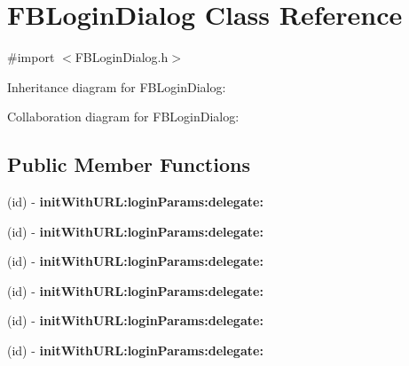 \hypertarget{interface_f_b_login_dialog}{
\section{\-F\-B\-Login\-Dialog \-Class \-Reference}
\label{interface_f_b_login_dialog}
}


{\ttfamily \#import $<$\-F\-B\-Login\-Dialog.\-h$>$}



\-Inheritance diagram for \-F\-B\-Login\-Dialog\-:


\-Collaboration diagram for \-F\-B\-Login\-Dialog\-:
\subsection*{\-Public \-Member \-Functions}
\begin{DoxyCompactItemize}
\item 
\hypertarget{interface_f_b_login_dialog_aa44183cac23b8a20238222be5a338f10}{
(id) -\/ {\bfseries init\-With\-U\-R\-L\-:login\-Params\-:delegate\-:}}
\label{interface_f_b_login_dialog_aa44183cac23b8a20238222be5a338f10}

\item 
\hypertarget{interface_f_b_login_dialog_aa44183cac23b8a20238222be5a338f10}{
(id) -\/ {\bfseries init\-With\-U\-R\-L\-:login\-Params\-:delegate\-:}}
\label{interface_f_b_login_dialog_aa44183cac23b8a20238222be5a338f10}

\item 
\hypertarget{interface_f_b_login_dialog_aa44183cac23b8a20238222be5a338f10}{
(id) -\/ {\bfseries init\-With\-U\-R\-L\-:login\-Params\-:delegate\-:}}
\label{interface_f_b_login_dialog_aa44183cac23b8a20238222be5a338f10}

\item 
\hypertarget{interface_f_b_login_dialog_aa44183cac23b8a20238222be5a338f10}{
(id) -\/ {\bfseries init\-With\-U\-R\-L\-:login\-Params\-:delegate\-:}}
\label{interface_f_b_login_dialog_aa44183cac23b8a20238222be5a338f10}

\item 
\hypertarget{interface_f_b_login_dialog_aa44183cac23b8a20238222be5a338f10}{
(id) -\/ {\bfseries init\-With\-U\-R\-L\-:login\-Params\-:delegate\-:}}
\label{interface_f_b_login_dialog_aa44183cac23b8a20238222be5a338f10}

\item 
\hypertarget{interface_f_b_login_dialog_aa44183cac23b8a20238222be5a338f10}{
(id) -\/ {\bfseries init\-With\-U\-R\-L\-:login\-Params\-:delegate\-:}}
\label{interface_f_b_login_dialog_aa44183cac23b8a20238222be5a338f10}

\end{DoxyCompactItemize}
